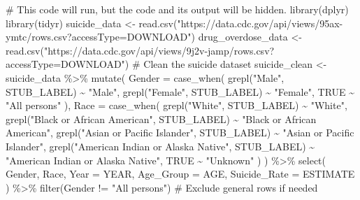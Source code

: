 \documentclass[
  letterpaper,
  DIV=11,
  numbers=noendperiod]{scrartcl}
\newenvironment{Shaded}{\begin{snugshade}}{\end{snugshade}}
\newcommand{\AttributeTok}[1]{\textcolor[rgb]{0.40,0.45,0.13}{#1}}
\newcommand{\CommentTok}[1]{\textcolor[rgb]{0.37,0.37,0.37}{#1}}
\newcommand{\ConstantTok}[1]{\textcolor[rgb]{0.56,0.35,0.01}{#1}}
\newcommand{\FunctionTok}[1]{\textcolor[rgb]{0.28,0.35,0.67}{#1}}
\newcommand{\NormalTok}[1]{\textcolor[rgb]{0.00,0.23,0.31}{#1}}
\newcommand{\OtherTok}[1]{\textcolor[rgb]{0.00,0.23,0.31}{#1}}
\newcommand{\SpecialCharTok}[1]{\textcolor[rgb]{0.37,0.37,0.37}{#1}}
\newcommand{\StringTok}[1]{\textcolor[rgb]{0.13,0.47,0.30}{#1}}
\begin{document}
\begin{Shaded}
\begin{Highlighting}[]
\CommentTok{\# This code will run, but the code and its output will be hidden.}
\FunctionTok{library}\NormalTok{(dplyr)}
\FunctionTok{library}\NormalTok{(tidyr)}
\NormalTok{suicide\_data }\OtherTok{\textless{}{-}} \FunctionTok{read.csv}\NormalTok{(}\StringTok{"https://data.cdc.gov/api/views/95ax{-}ymtc/rows.csv?accessType=DOWNLOAD"}\NormalTok{)}
\NormalTok{drug\_overdose\_data }\OtherTok{\textless{}{-}} \FunctionTok{read.csv}\NormalTok{(}\StringTok{"https://data.cdc.gov/api/views/9j2v{-}jamp/rows.csv?accessType=DOWNLOAD"}\NormalTok{)}
\CommentTok{\# Clean the suicide dataset}
\NormalTok{suicide\_clean }\OtherTok{\textless{}{-}}\NormalTok{ suicide\_data }\SpecialCharTok{\%\textgreater{}\%}
  \FunctionTok{mutate}\NormalTok{(}
    \AttributeTok{Gender =} \FunctionTok{case\_when}\NormalTok{(}
      \FunctionTok{grepl}\NormalTok{(}\StringTok{"Male"}\NormalTok{, STUB\_LABEL) }\SpecialCharTok{\textasciitilde{}} \StringTok{"Male"}\NormalTok{,}
      \FunctionTok{grepl}\NormalTok{(}\StringTok{"Female"}\NormalTok{, STUB\_LABEL) }\SpecialCharTok{\textasciitilde{}} \StringTok{"Female"}\NormalTok{,}
      \ConstantTok{TRUE} \SpecialCharTok{\textasciitilde{}} \StringTok{"All persons"}
\NormalTok{    ),}
    \AttributeTok{Race =} \FunctionTok{case\_when}\NormalTok{(}
      \FunctionTok{grepl}\NormalTok{(}\StringTok{"White"}\NormalTok{, STUB\_LABEL) }\SpecialCharTok{\textasciitilde{}} \StringTok{"White"}\NormalTok{,}
      \FunctionTok{grepl}\NormalTok{(}\StringTok{"Black or African American"}\NormalTok{, STUB\_LABEL) }\SpecialCharTok{\textasciitilde{}} \StringTok{"Black or African American"}\NormalTok{,}
      \FunctionTok{grepl}\NormalTok{(}\StringTok{"Asian or Pacific Islander"}\NormalTok{, STUB\_LABEL) }\SpecialCharTok{\textasciitilde{}} \StringTok{"Asian or Pacific Islander"}\NormalTok{,}
      \FunctionTok{grepl}\NormalTok{(}\StringTok{"American Indian or Alaska Native"}\NormalTok{, STUB\_LABEL) }\SpecialCharTok{\textasciitilde{}} \StringTok{"American Indian or Alaska Native"}\NormalTok{,}
      \ConstantTok{TRUE} \SpecialCharTok{\textasciitilde{}} \StringTok{"Unknown"}
\NormalTok{    )}
\NormalTok{  ) }\SpecialCharTok{\%\textgreater{}\%}
  \FunctionTok{select}\NormalTok{(}
\NormalTok{    Gender, }
\NormalTok{    Race,}
    \AttributeTok{Year =}\NormalTok{ YEAR,}
    \AttributeTok{Age\_Group =}\NormalTok{ AGE,}
    \AttributeTok{Suicide\_Rate =}\NormalTok{ ESTIMATE}
\NormalTok{  ) }\SpecialCharTok{\%\textgreater{}\%}
  \FunctionTok{filter}\NormalTok{(Gender }\SpecialCharTok{!=} \StringTok{"All persons"}\NormalTok{) }\CommentTok{\# Exclude general rows if needed}


\end{Highlighting}
\end{Shaded}
\end{document}
